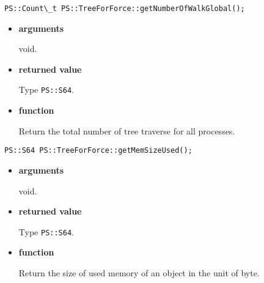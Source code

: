 \begin{screen}
\begin{verbatim}
PS::Count\_t PS::TreeForForce::getNumberOfWalkGlobal();
\end{verbatim}
\end{screen}

\begin{itemize}

\item {\bf arguments}

void.

\item {\bf returned value}

Type {\tt PS::S64}.

\item {\bf function}

Return the total number of tree traverse for all processes.

\end{itemize}

\begin{screen}
\begin{verbatim}
PS::S64 PS::TreeForForce::getMemSizeUsed();
\end{verbatim}
\end{screen}

\begin{itemize}

\item {\bf arguments}

void.

\item {\bf returned value}

Type {\tt PS::S64}.

\item {\bf function}

Return the size of used memory of an object in the unit of byte.


\end{itemize}

\label{sec:getEpjFromId}

